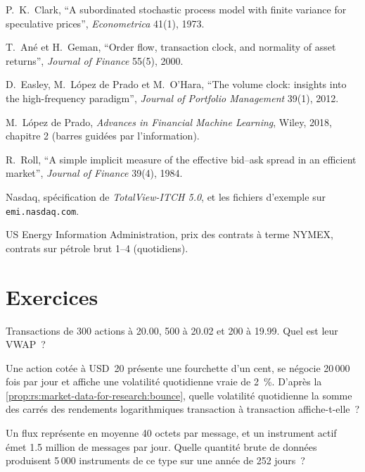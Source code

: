 \begin{omsources}
\item P.~K.~Clark, ``A subordinated stochastic process model with finite variance for speculative prices'',
\emph{Econometrica} 41(1), 1973.
\item T.~Ané et H.~Geman, ``Order flow, transaction clock, and normality of asset returns'', \emph{Journal of Finance} 55(5),
2000.
\item D.~Easley, M.~López de Prado et M.~O'Hara, ``The volume clock: insights into the high-frequency paradigm'',
\emph{Journal of Portfolio Management} 39(1), 2012.
\item M.~López de Prado, \emph{Advances in Financial Machine Learning}, Wiley, 2018, chapitre 2 (barres guidées par l'information).
\item R.~Roll, ``A simple implicit measure of the effective bid--ask spread in an efficient market'', \emph{Journal of Finance}
39(4), 1984.
\item Nasdaq, spécification de \emph{TotalView-ITCH 5.0}, et les fichiers d'exemple sur \texttt{emi.nasdaq.com}.
\item US Energy Information Administration, prix des contrats à terme NYMEX, contrats sur pétrole brut 1--4 (quotidiens).
\end{omsources}

\section{Exercices}

\begin{exercise}[$\star$]\label{exo:rs:market-data-for-research:1}
Transactions de 300 actions à 20.00, 500 à 20.02 et 200 à 19.99. Quel est leur VWAP~?
\end{exercise}

\begin{exercise}[$\star$]\label{exo:rs:market-data-for-research:2}
Une action cotée à USD~20 présente une fourchette d'un cent, se négocie 20\,000 fois par jour et affiche une volatilité quotidienne vraie de 2~\%. D'après
la \cref{prop:rs:market-data-for-research:bounce}, quelle volatilité quotidienne la somme des carrés des rendements logarithmiques transaction à transaction affiche-t-elle~?
\end{exercise}

\begin{exercise}[$\star$]\label{exo:rs:market-data-for-research:3}
Un flux représente en moyenne 40 octets par message, et un instrument actif émet 1.5 million de messages par jour. Quelle quantité brute de données produisent
5\,000 instruments de ce type sur une année de 252 jours~?
\end{exercise}

